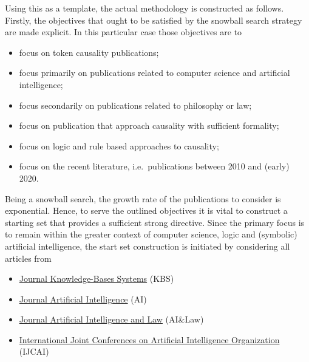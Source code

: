 \documentclass[11pt,a4paper]{book}
\theoremstyle{definition}
\theoremstyle{definition}
\theoremstyle{definition}
\theoremstyle{remark}
\begin{document}
Using this as a template, the actual methodology is constructed as follows. Firstly, the objectives that ought to be satisfied by the snowball search strategy are made explicit. In this particular case those objectives are to
\begin{itemize}
\item focus on token causality publications;
\item focus primarily on publications related to computer science and artificial intelligence;
\item focus secondarily on publications related to philosophy or law;
\item focus on publication that approach causality with sufficient formality;
\item focus on logic and rule based approaches to causality;
\item focus on the recent literature, i.e.\ publications between 2010 and (early) 2020.
\end{itemize}
Being a snowball search, the growth rate of the publications to consider is exponential. Hence, to serve the outlined objectives it is vital to construct a starting set that provides a sufficient strong directive.
Since the primary focus is to remain within the greater context of computer science, logic and (symbolic) artificial intelligence, the start set construction is initiated by considering all articles from  
\begin{itemize}
\item \href{https://www.journals.elsevier.com/knowledge-based-systems}{Journal Knowledge-Bases Systems} (KBS)
\item \href{https://www.journals.elsevier.com/artificial-intelligence}{Journal Artificial Intelligence} (AI)
\item \href{https://www.springer.com/journal/10506}{Journal Artificial Intelligence and Law} (AI\&Law)
\item \href{https://www.ijcai.org/}{International Joint Conferences on Artificial Intelligence Organization} (IJCAI)
\end{itemize}
\end{document}
